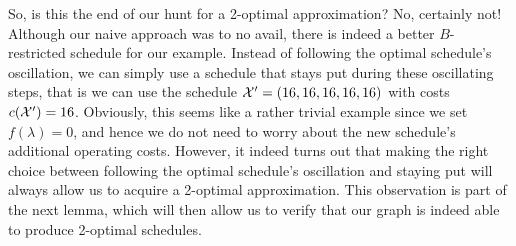 So, is this the end of our hunt for a 2-optimal approximation? No, certainly not! Although our naive approach was to no avail, there is indeed a better $B$-restricted schedule for our example. Instead of following the optimal schedule's oscillation, we can simply use a schedule that stays put during these oscillating steps, that is we can use the schedule $\mathcal{X}'=(16,16,16,16,16)$ with costs $c(\mathcal{X}')=16$. Obviously, this seems like a rather trivial example since we set $f(\lambda)=0$, and hence we do not need to worry about the new schedule's additional operating costs. However, it indeed turns out that making the right choice between following the optimal schedule's oscillation and staying put will always allow us to acquire a 2-optimal approximation. This observation is part of the next lemma, which will then allow us to verify that our graph is indeed able to produce 2-optimal schedules.

